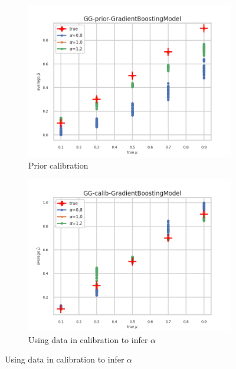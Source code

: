 \begin{figure}[ht!]
  \centering
  \begin{subfigure}[t]{0.49\linewidth}
    \includegraphics[width=\linewidth]{COMPARE/GG-prior/GradientBoostingModel/profusion_true_mu_target_mean.png}
    \caption{Prior calibration}
  \end{subfigure}%
  \hfill
  \begin{subfigure}[t]{0.49\linewidth}
    \includegraphics[width=\linewidth]{COMPARE/GG-calib/GradientBoostingModel/profusion_true_mu_target_mean.png}
    \caption{Using data in calibration to infer $\alpha$}
  \end{subfigure}


\end{figure}
